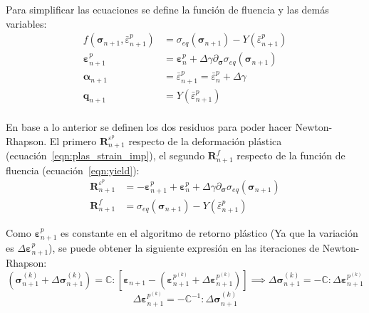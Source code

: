 \documentclass[12pt]{article}
\begin{document}
Para simplificar las ecuaciones se define la función de fluencia y las demás variables:
\begin{align}
    f\left(\pmb{\sigma}_{n+1}, \bar\varepsilon^p_{n+1}\right) &= \sigma_{eq}\left(\pmb{\sigma}_{n+1}\right) - Y\left(\bar\varepsilon^p_{n+1}\right) \label{eqn:yield}\\
    \pmb{\varepsilon}_{n+1}^p &= \pmb{\varepsilon}^p_{n} + \Delta\gamma\partial_{\pmb{\sigma}}\sigma_{eq}\left(\pmb{\sigma}_{n+1}\right)  \label{eqn:plas_strain_imp}\\
    \pmb{\alpha}_{n+1} &= \bar\varepsilon^p_{n+1} = \bar\varepsilon^p_{n} + \Delta\gamma  \label{eqn:eff_plas_strain_imp}\\
    \pmb{q}_{n+1} &= Y(\bar\varepsilon^p_{n+1}) \\
\end{align}

En base a lo anterior se definen los dos residuos para poder hacer Newton-Rhapson. El primero $\pmb{R}_{n+1}^{\varepsilon^p}$ respecto de la deformación plástica (ecuación~\ref{eqn:plas_strain_imp}), el segundo $\pmb{R}_{n+1}^{f}$ respecto de la función de fluencia (ecuación~\ref{eqn:yield}):
\begin{align}
    \pmb{R}_{n+1}^{\varepsilon^p} &= -\pmb{\varepsilon}_{n+1}^p + \pmb{\varepsilon}_{n}^p + \Delta\gamma\partial_{\pmb{\sigma}}\sigma_{eq}\left(\pmb{\sigma}_{n+1}\right) \\
    \pmb{R}_{n+1}^{f} &= \sigma_{eq}\left(\pmb{\sigma}_{n+1}\right) - Y\left(\bar\varepsilon^p_{n+1}\right)
\end{align}

Como $\pmb{\varepsilon}^p_{n+1}$ es constante en el algoritmo de retorno plástico (Ya que la variación es $\Delta\pmb{\varepsilon}^p_{n+1}$), se puede obtener la siguiente expresión en las iteraciones de Newton-Rhapson:
\[
\left(\pmb{\sigma}_{n+1}^{(k)} + \Delta\pmb{\sigma}_{n+1}^{(k)}\right) = \mathbb{C}:\left[\pmb{\varepsilon}_{n+1} - \left(\pmb{\varepsilon}_{n+1}^{p^{(k)}} + \Delta\pmb{\varepsilon}_{n+1}^{p^{(k)}}\right)\right] \implies \Delta\pmb{\sigma}_{n+1}^{(k)} = -\mathbb{C}:\Delta\pmb{\varepsilon}_{n+1}^{p^{(k)}}
\]\[
    \Delta\pmb{\varepsilon}_{n+1}^{p^{(k)}} = -\mathbb{C}^{-1}:\Delta\pmb{\sigma}_{n+1}^{(k)}
\]
\end{document}
